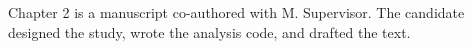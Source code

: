 Chapter 2 is a manuscript co-authored with M. Supervisor. The candidate
designed the study, wrote the analysis code, and drafted the text.
